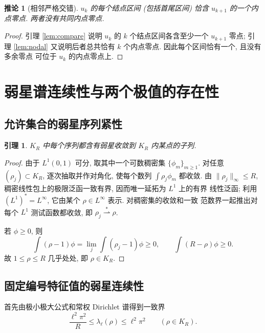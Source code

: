\documentclass[UTF8]{ctexart}
\newtheorem{lemma}[theorem]{引理}
\newtheorem{corollary}[theorem]{推论}
\begin{document}
\begin{corollary}[相邻严格交错]\label{cor:interlace}
$u_k$ 的每个结点区间 (包括首尾区间) 恰含 $u_{k+1}$ 的一个内点零点. 两者没有共同内点零点.
\end{corollary}

\begin{proof}
引理 \ref{lem:compare} 说明 $u_k$ 的 $k$ 个结点区间各含至少一个 $u_{k+1}$ 零点; 引理
\ref{lem:nodal} 又说明后者总共恰有 $k$ 个内点零点. 因此每个区间恰有一个, 且没有多余零点
可位于 $u_k$ 的内点零点上.
\end{proof}

\section{弱星谱连续性与两个极值的存在性}
\subsection{允许集合的弱星序列紧性}

\begin{lemma}\label{lem:wscompact}
$K_R$ 中每个序列都含有弱星收敛到 $K_R$ 内某点的子列.
\end{lemma}

\begin{proof}
由于 $L^1(0,1)$ 可分, 取其中一个可数稠密集 $\{\phi_m\}_{m\ge1}$. 对任意
$(\rho_j)\subset K_R$, 逐次抽取并作对角化, 使每个数列 $\int\rho_j\phi_m$ 都收敛. 由
$\|\rho_j\|_\infty\le R$, 稠密线性包上的极限泛函一致有界, 因而唯一延拓为 $L^1$ 上的有界
线性泛函; 利用 $(L^1)^*=L^\infty$, 它由某个 $\rho\in L^\infty$ 表示. 对稠密集的收敛和一致
范数界一起推出对每个 $L^1$ 测试函数都收敛, 即 $\rho_j\overset{*}{\rightharpoonup}\rho$.

若 $\phi\ge0$, 则
\begin{equation*}
	\int(\rho-1)\phi=\lim_j\int(\rho_j-1)\phi\ge0,\qquad
	\int(R-\rho)\phi\ge0 .
\end{equation*}
故 $1\le\rho\le R$ 几乎处处, 即 $\rho\in K_R$.
\end{proof}

\subsection{固定编号特征值的弱星连续性}

首先由极小极大公式和常权 Dirichlet 谱得到一致界
\begin{equation}
	\frac{\ell^2\pi^2}{R}\le\lambda_\ell(\rho)\le\ell^2\pi^2
		\qquad(\rho\in K_R).
	\label{eq:uniform}
\end{equation}
\end{document}
